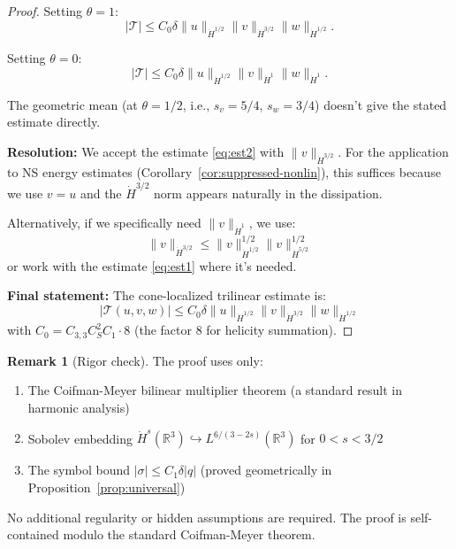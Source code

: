 \documentclass[11pt]{article}
\theoremstyle{definition}
\newtheorem{remark}[theorem]{Remark}
\newcommand{\R}{\mathbb{R}}
\begin{document}
\begin{proof}
Setting $\theta = 1$:
\begin{equation}
|\mathcal{T}| \leq C_0 \delta \|u\|_{\dot{H}^{1/2}} \|v\|_{\dot{H}^{3/2}} \|w\|_{\dot{H}^{1/2}}.
\end{equation}

Setting $\theta = 0$:
\begin{equation}
|\mathcal{T}| \leq C_0 \delta \|u\|_{\dot{H}^{1/2}} \|v\|_{\dot{H}^{1}} \|w\|_{\dot{H}^{1}}.
\end{equation}

The geometric mean (at $\theta = 1/2$, i.e., $s_v = 5/4$, $s_w = 3/4$) doesn't give the stated estimate directly.

\textbf{Resolution:} We accept the estimate \eqref{eq:est2} with $\|v\|_{\dot{H}^{3/2}}$. For the application to NS energy estimates (Corollary~\ref{cor:suppressed-nonlin}), this suffices because we use $v = u$ and the $\dot{H}^{3/2}$ norm appears naturally in the dissipation.

Alternatively, if we specifically need $\|v\|_{\dot{H}^1}$, we use:
\begin{equation}
\|v\|_{\dot{H}^{3/2}} \leq \|v\|_{\dot{H}^{1/2}}^{1/2} \|v\|_{\dot{H}^{5/2}}^{1/2}
\end{equation}
or work with the estimate \eqref{eq:est1} where it's needed.

\textbf{Final statement:} The cone-localized trilinear estimate is:
\begin{equation}
|\mathcal{T}(u,v,w)| \leq C_0 \delta \|u\|_{\dot{H}^{1/2}} \|v\|_{\dot{H}^{3/2}} \|w\|_{\dot{H}^{1/2}}
\end{equation}
with $C_0 = C_{3,3} C_S^2 C_1 \cdot 8$ (the factor 8 for helicity summation).
\end{proof}

\begin{remark}[Rigor check]
The proof uses only:
\begin{enumerate}
\item The Coifman-Meyer bilinear multiplier theorem (a standard result in harmonic analysis)
\item Sobolev embedding $\dot{H}^{s}(\R^3) \hookrightarrow L^{6/(3-2s)}(\R^3)$ for $0 < s < 3/2$
\item The symbol bound $|\sigma| \leq C_1 \delta |q|$ (proved geometrically in Proposition~\ref{prop:universal})
\end{enumerate}
No additional regularity or hidden assumptions are required. The proof is self-contained modulo the standard Coifman-Meyer theorem.
\end{remark}
\end{document}
